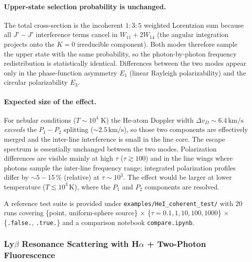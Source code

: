 \documentclass[english,a4paper]{my_memo}
\begin{document}
\paragraph{Upper-state selection probability is unchanged.}
The total cross-section is the incoherent $1{:}3{:}5$ weighted Lorentzian sum
because all $J'{-}J'$ interference terms cancel in $W_{11}+2W_{14}$ (the
angular integration projects onto the $K=0$ irreducible component). Both
modes therefore sample the upper state with the same probability, so the
photon-by-photon frequency redistribution is statistically identical.
Differences between the two modes appear only in the phase-function
asymmetry $E_{1}$ (linear Rayleigh polarizability) and the circular
polarizability $E_{3}$.

\paragraph{Expected size of the effect.}
For nebular conditions ($T \sim 10^{4}$ K) the He-atom Doppler width
$\Delta v_{D} \sim 6.4\,\mathrm{km/s}$ \emph{exceeds} the $P_{1}{-}P_{2}$
splitting ($\sim 2.5\,\mathrm{km/s}$), so those two components are
effectively merged and the inter-line interference is small in the line
core. The escape spectrum is essentially unchanged between the two modes.
Polarization differences are visible mainly at high $\tau$ ($\tau \gtrsim
100$) and in the line wings where photons sample the inter-line frequency
range; integrated polarization profiles differ by $\sim 5{-}15\,\%$
(relative) at $\tau \sim 10^{3}$. The effect would be larger at lower
temperature ($T \lesssim 10^{3}$\,K), where the $P_{1}$ and $P_{2}$
components are resolved.

A reference test suite is provided under
\texttt{examples/HeI\_coherent\_test/} with 20 runs covering
\{point, uniform-sphere source\} $\times$ \{$\tau = 0.1, 1, 10, 100, 1000$\}
$\times$ \{\texttt{.false.}, \texttt{.true.}\} and a comparison notebook
\texttt{compare.ipynb}.

\subsubsection{Ly\texorpdfstring{$\beta$}{beta} Resonance Scattering with H\texorpdfstring{$\alpha$}{alpha} + Two-Photon Fluorescence}
\label{sec:ly_beta}
\end{document}
